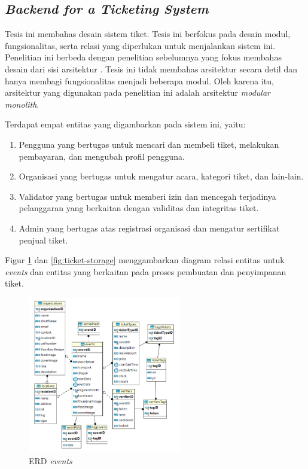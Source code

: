 \subsection{\textit{Backend for a Ticketing System}}

Tesis ini membahas desain sistem tiket. Tesis ini berfokus pada desain modul, fungsionalitas, serta relasi yang diperlukan untuk menjalankan sistem ini. Penelitian ini berbeda dengan penelitian sebelumnya yang fokus membahas desain dari sisi arsitektur \parencite{backendForTicketing}. Tesis ini tidak membahas arsitektur secara detil dan hanya membagi fungsionalitas menjadi beberapa modul. Oleh karena itu, arsitektur yang digunakan pada penelitian ini adalah arsitektur \textit{modular monolith}.

Terdapat empat entitas yang digambarkan pada sistem ini, yaitu:

\begin{enumerate}
    \item Pengguna yang bertugas untuk mencari dan membeli tiket, melakukan pembayaran, dan mengubah profil pengguna.
    \item Organisasi yang bertugas untuk mengatur acara, kategori tiket, dan lain-lain.
    \item Validator yang bertugas untuk memberi izin dan mencegah terjadinya pelanggaran yang berkaitan dengan validitas dan integritas tiket.
    \item Admin yang bertugas atas registrasi organisasi dan mengatur sertifikat penjual tiket.
\end{enumerate}

\pagebreak

Figur \ref{fig:event-rm} dan \ref{fig:ticket-storage} menggambarkan diagram relasi entitas untuk \textit{events} dan entitas yang berkaitan pada proses pembuatan dan penyimpanan tiket.

\begin{figure}[htbp]
    \centering
    \includegraphics[width=0.6\textwidth]{resources/chapter-2/event-rm.png}
    \caption{ERD \textit{events} \parencite{backendForTicketing}}
    \label{fig:event-rm}
\end{figure}

